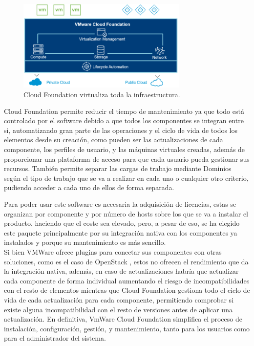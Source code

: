 \begin{figure}[h!]
  \centering
  \includegraphics[width=0.75\textwidth]{imaxes/cap2recursos/overviewCF.png}
  \caption{Cloud Foundation virtualiza toda la infraestructura.}
  \label{fig:infraCloudFound}
\end{figure}

Cloud Foundation permite reducir el tiempo de mantenimiento ya que todo está controlado por el software debido a que todos los componentes se integran entre si, automatizando gran parte de las operaciones y el ciclo de vida de todos los elementos desde su creación, como pueden ser las actualizaciones de cada componente, los perfiles de usuario, y las máquinas virtuales creadas, además de proporcionar una plataforma de acceso para que cada usuario pueda gestionar sus recursos.
También permite separar las cargas de trabajo mediante Dominios según el tipo de trabajo que se va a realizar en cada uno o cualquier otro criterio, pudiendo acceder a cada uno de ellos de forma separada. 




Para poder usar este software es necesaria la adquisición de licencias, estas se organizan por componente y por número de hosts sobre los que se va a instalar el producto, haciendo que el coste sea elevado, pero, a pesar de eso, se ha elegido este paquete principalmente por su integración nativa con los componentes ya instalados y porque su mantenimiento es más sencillo. \\
Si bien VMWare ofrece plugins para conectar sus componentes con otras soluciones, como es el caso de OpenStack \cite{opestackintegrated}, estos no ofrecen el rendimiento que da la integración nativa, además, en caso de actualizaciones habría que actualizar cada componente de forma individual aumentando el riesgo de incompatibilidades con el resto de elementos mientras que Cloud Foundation gestiona todo el ciclo de vida de cada actualización para cada componente, permitiendo comprobar si existe alguna incompatibilidad con el resto de versiones antes de aplicar una actualización. En definitiva, VmWare Cloud Foundation simplifica el proceso de instalación, configuración, gestión, y mantenimiento, tanto para los usuarios como para el administrador del sistema.

